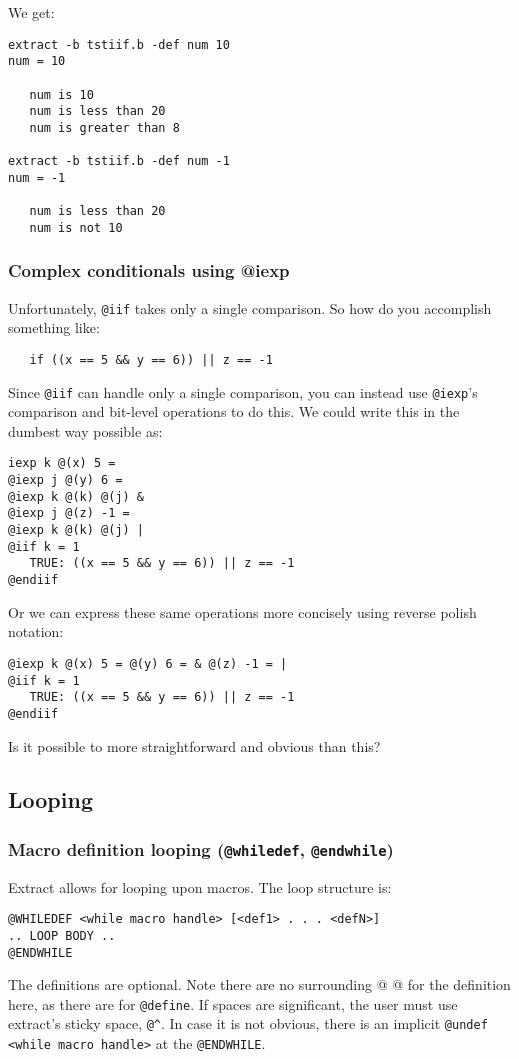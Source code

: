 We get:
\begin{verbatim}
extract -b tstiif.b -def num 10
num = 10

   num is 10
   num is less than 20
   num is greater than 8

extract -b tstiif.b -def num -1
num = -1

   num is less than 20
   num is not 10
\end{verbatim}

\subsubsection{Complex conditionals using @iexp}
\label{sec-iexp-if}
Unfortunately, {\tt @iif} takes only a single comparison.  So how do you
accomplish something like:
\begin{verbatim}
   if ((x == 5 && y == 6)) || z == -1
\end{verbatim}

Since {\tt @iif} can handle only a single comparison, you can instead use
{\tt @iexp}'s comparison and bit-level operations to do this.  We could
write this in the dumbest way possible as:
\begin{verbatim}
iexp k @(x) 5 =
@iexp j @(y) 6 =
@iexp k @(k) @(j) &
@iexp j @(z) -1 =
@iexp k @(k) @(j) |
@iif k = 1
   TRUE: ((x == 5 && y == 6)) || z == -1
@endiif
\end{verbatim}

Or we can express these same operations more concisely using reverse polish
notation:
\begin{verbatim}
@iexp k @(x) 5 = @(y) 6 = & @(z) -1 = |
@iif k = 1
   TRUE: ((x == 5 && y == 6)) || z == -1
@endiif
\end{verbatim}

Is it possible to more straightforward and obvious than this?

\subsection{Looping}

\subsubsection{Macro definition looping ({\tt @whiledef}, {\tt @endwhile})}
\label{sec-whiledef}
Extract allows for looping upon macros.  The loop structure is:
\begin{verbatim}
@WHILEDEF <while macro handle> [<def1> . . . <defN>]
.. LOOP BODY ..
@ENDWHILE
\end{verbatim}
The definitions are optional.  Note there are no surrounding @ @ for the
definition here, as there are for {\tt @define}.  If 
spaces are significant, the user must use extract's sticky space, \verb+@^+.
In case it is not obvious, there is an implicit
{\tt @undef <while macro handle>} at the {\tt @ENDWHILE}.

